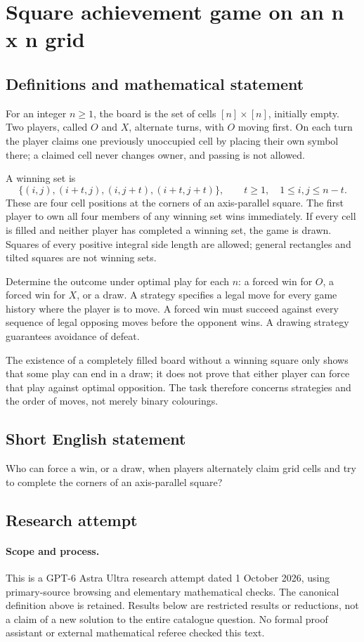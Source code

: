 \documentclass[11pt,a4paper]{article}
\begin{document}
\section*{Square achievement game on an n x n grid}\label{statement}

\subsection{Definitions and mathematical statement}
For an integer $n\ge1$, the board is the set of cells
$[n]\times[n]$, initially empty. Two players, called $O$ and $X$, alternate
turns, with $O$ moving first. On each turn the player claims one previously
unoccupied cell by placing their own symbol there; a claimed cell never
changes owner, and passing is not allowed.

A winning set is
\[
 \{(i,j),(i+t,j),(i,j+t),(i+t,j+t)\},
 \qquad t\ge1,\quad 1\le i,j\le n-t.
\]
These are four cell positions at the corners of an axis-parallel square.
The first player to own all four members of any winning set wins immediately.
If every cell is filled and neither player has completed a winning set,
the game is drawn. Squares of every positive integral side length are
allowed; general rectangles and tilted squares are not winning sets.

Determine the outcome under optimal play for each $n$: a forced win for
$O$, a forced win for $X$, or a draw. A strategy specifies a legal move
for every game history where the player is to move. A forced win must
succeed against every sequence of legal opposing moves before the opponent
wins. A drawing strategy guarantees avoidance of defeat.

The existence of a completely filled board without a winning square only
shows that some play can end in a draw; it does not prove that either
player can force that play against optimal opposition. The task therefore
concerns strategies and the order of moves, not merely binary colourings.
\subsection{Short English statement}
Who can force a win, or a draw, when players alternately claim grid cells and try to complete the corners of an axis-parallel square?
\subsection{Research attempt}
\paragraph{Scope and process.}
This is a GPT-6 Astra Ultra research attempt dated 1 October 2026, using
primary-source browsing and elementary mathematical checks. The canonical
definition above is retained. Results below are restricted results or
reductions, not a claim of a new solution to the entire catalogue question.
No formal proof assistant or external mathematical referee checked this text.
\end{document}
